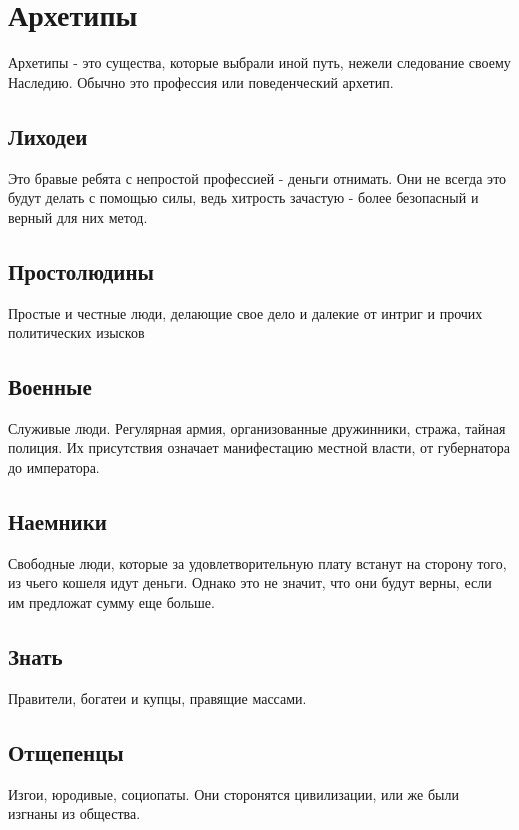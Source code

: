 \printindex[monsters]


\section{Архетипы}
Архетипы - это существа, которые выбрали иной путь, нежели следование своему Наследию. Обычно это профессия или поведенческий архетип.

\subsection{Лиходеи}
Это бравые ребята с непростой профессией - деньги отнимать. Они не всегда это будут делать с помощью силы, ведь хитрость зачастую - более безопасный и верный для них метод.

\subsection{Простолюдины}
Простые и честные люди, делающие свое дело и далекие от интриг и прочих политических изысков

\subsection{Военные}
Служивые люди. Регулярная армия, организованные дружинники, стража, тайная полиция. Их присутствия означает манифестацию местной власти, от губернатора до императора.

\subsection{Наемники}
Свободные люди, которые за удовлетворительную плату встанут на сторону того, из чьего кошеля идут деньги. Однако это не значит, что они будут верны, если им предложат сумму еще больше.

\subsection{Знать}
Правители, богатеи и купцы, правящие массами.

\subsection{Отщепенцы}
Изгои, юродивые, социопаты. Они сторонятся цивилизации, или же были изгнаны из общества.

